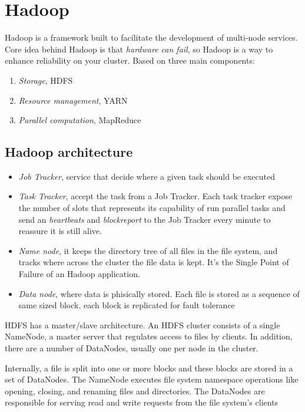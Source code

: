 \section{Hadoop}
Hadoop is a framework built to facilitate the development of multi-node services. Core idea behind Hadoop is that \textit{hardware can fail}, so Hadoop is a way to enhance reliability on your cluster. Based on three main components:
\begin{enumerate}
    \item \textit{Storage}, HDFS
    \item \textit{Resource management}, YARN
    \item \textit{Parallel computation}, MapReduce
\end{enumerate}

\subsection{Hadoop architecture}
\begin{itemize}
    \item \textit{Job Tracker}, service that decide where a given task should be executed
    \item \textit{Task Tracker}, accept the task from a Job Tracker. Each task tracker expose the number of slots that represents its capability of run parallel tasks and send an \textit{heartbeats} and \textit{blockreport} to the Job Tracker every minute to reassure it is still alive.
    \item \textit{Name node}, it keeps the directory tree of all files in the file system, and tracks where across the cluster the file data is kept. It's the Single Point of Failure of an Hadoop application.
    \item \textit{Data node}, where data is phisically stored. Each file is stored as a sequence of same sized block, each block is replicated for fault tolerance
\end{itemize}

HDFS has a master/slave architecture. An HDFS cluster consists of a single NameNode, a master server that regulates access to files by clients. In addition, there are a number of DataNodes, usually one per node in the cluster.

Internally, a file is split into one or more blocks and these blocks are stored in a set of DataNodes. The NameNode executes file system namespace operations like opening, closing, and renaming files and directories. The DataNodes are responsible for serving read and write requests from the file system’s clients


